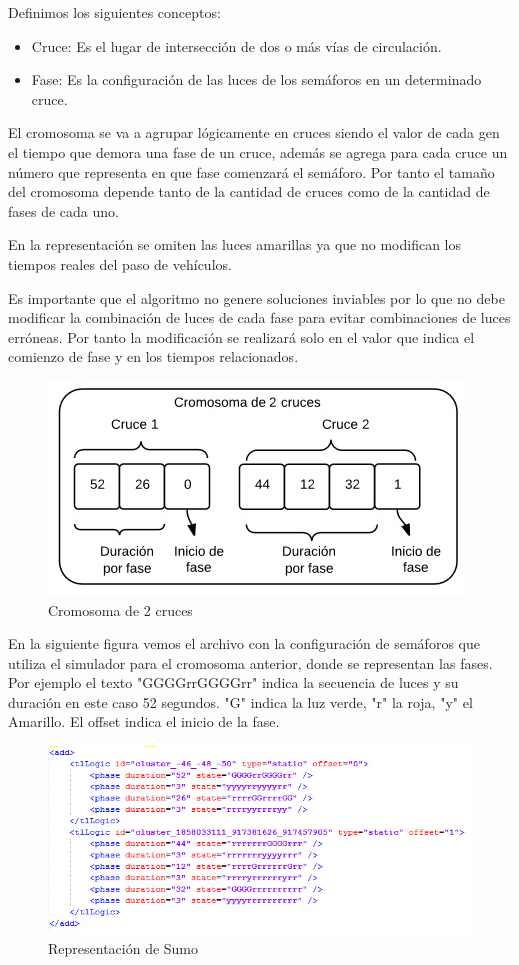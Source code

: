 Definimos los siguientes conceptos:
\begin{itemize}
	\item Cruce: Es el lugar de intersección de dos o más vías de circulación.
	\item Fase: Es la configuración de las luces de los semáforos en un determinado cruce.
\end{itemize}


El  cromosoma  se  va  a  agrupar  lógicamente  en  cruces siendo el valor de cada gen el tiempo que demora una
fase de un cruce, además se agrega para cada cruce un número que representa en que fase comenzará el semáforo. 
Por tanto el tamaño del cromosoma depende tanto de la cantidad de cruces como de la cantidad de fases de cada uno.

En la representación se omiten las luces amarillas ya que no modifican los tiempos reales del paso de vehículos.
 
Es  importante que el algoritmo no genere soluciones inviables por lo que no debe modificar la combinación de luces de cada fase para evitar combinaciones de luces erróneas. Por tanto la modificación se realizará solo en el valor que indica el comienzo de fase y en los tiempos relacionados.

\begin{figure}[h]
\centering
\includegraphics[width=0.7\linewidth]{Figures/cromosoma1}
\caption{Cromosoma de 2 cruces}
\label{fig:cromosoma1}
\end{figure}

En la siguiente figura vemos el archivo con la configuración de semáforos que utiliza el simulador para el cromosoma anterior, donde se representan las fases. Por ejemplo el texto "GGGGrrGGGGrr" indica la secuencia de luces y su duración en este caso 52 segundos. 
"G" indica la luz verde, "r" la roja, "y" el Amarillo. El offset indica el inicio de la fase.

\begin{figure}[h]
\centering
\includegraphics[width=\linewidth]{Figures/rep_sumo}
\caption{Representación de Sumo}
\label{fig:rep_sumo}
\end{figure}



